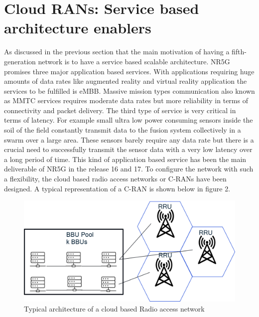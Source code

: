 \section{Cloud RANs: Service based architecture enablers} 
As discussed in the previous section that the main motivation of having a fifth-generation network is to have a service based scalable architecture. NR5G promises three major application based services. With applications requiring huge amounts of data rates like augmented reality and virtual reality application the services to be fulfilled is eMBB. Massive mission types communication also known as MMTC services requires moderate data rates but more reliability in terms of connectivity and packet delivery. The third type of service is very critical in terms of latency. For example small ultra low power consuming sensors inside the soil of the field constantly transmit data to the fusion system collectively in a swarm over a large area. These sensors barely require any data rate but there is a crucial need to successfully transmit the sensor data with a very low latency over a long period of time. This kind of application based service has been the main deliverable of NR5G in the release 16 and 17. To configure the network with such a flexibility, the cloud based radio access networks or C-RANs have been designed. A typical representation of a C-RAN is shown below in figure 2.

\begin{figure}[h!]
\centering
\includegraphics[width=1.0\textwidth]{pic-2.png}
\caption{Typical architecture of a cloud based Radio access network }
\end{figure}

